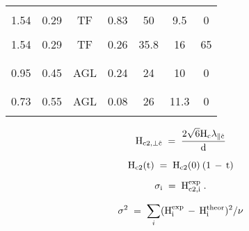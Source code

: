 {\begin{table}
\begin{center}
\begin{tabular}{|l|cccccc|}
& & & & & & \\ 
1.54 & 0.29 &TF  & 0.83 & 50 & 9.5  & 0 \\ 
& & & & & & \\ 
1.54 & 0.29 &TF  & 0.26 & 35.8 & 16  & 65 \\ 
& & & & & & \\ 
\hline
\hline
& & & & & & \\ 
0.95 & 0.45 & AGL& 0.24 & 24 & 10 & 0 \\ 
& & & & & & \\ 
\hline
\hline
& & & & & & \\ 
0.73\cite{iye82} & 0.55 & AGL & 0.08 & 26 & 11.3 & 0 \\ 
& & & & & & \\ 
\hline
\end{tabular}
\end{center}
\end{table}
}

{\newpage
\clearpage
\samepage \begin{figure}\vspace{5in}

\label{TINKvsAGL}
\end{figure}
}

{\newpage
\clearpage
\samepage \begin{displaymath}\rm H_{c2, \perp \hat{c}} \; = \; \frac{2 \sqrt{6} H_c \lambda_{\parallel \hat{c}}}{d}
\end{displaymath}
}

{\newpage
\clearpage
\samepage \begin{figure}\vspace{15cm}

\label{hc2temp}
\end{figure}
}

{\newpage
\clearpage
\samepage \begin{equation}\label{eqn:linear}
\rm H_{c2}(t) \; = \; H_{c2}(0) \: (1 \, - \, t)
\end{equation}
}

{\newpage
\clearpage
\samepage \begin{displaymath}\rm \sigma_i \; = \; H_{c2,i}^{exp} \; .
\end{displaymath}
}

{\newpage
\clearpage
\samepage \begin{displaymath}\sigma^2 \; = \; \sum_i \rm (H_i^{exp} \, - \, H_i^{theor})^2 / \nu
\end{displaymath}
}

